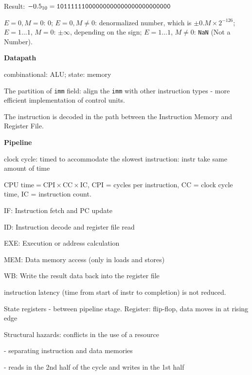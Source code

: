 \documentclass[10pt,landscape,a4paper]{article}
\begin{document}
\begin{multicols}{3}
Result: \(-0.5_{10} = \verb|10111111000000000000000000000000|\)

\(E = 0, M = 0\): 0; \(E = 0, M \neq 0\): denormalized number, which is \(\pm 0.M \times 2^{-126}\); \(E = 1\ldots 1\), \(M = 0\): \(\pm \infty\), depending on the sign; \(E = 1\ldots 1\), \(M \neq 0\): \verb|NaN| (Not a Number).

\textbf{Datapath}

combinational: ALU; state: memory

The partition of \verb|imm| field: align the \verb|imm| with other instruction types - more efficient implementation of control units.

The instruction is decoded in the path between the Instruction Memory and Register File.

\textbf{Pipeline}

clock cycle: timed to accommodate the slowest instruction: instr take same amount of time

\(\text{CPU time} = \text{CPI} \times \text{CC} \times \text{IC}\), CPI = cycles per instruction, CC = clock cycle time, IC = instruction count.

IF: Instruction fetch and PC update

ID: Instruction decode and register file read

EXE: Execution or address calculation

MEM: Data memory access (only in loads and stores)

WB: Write the result data back into the register file

instruction latency (time from start of instr to completion) is not reduced.

State registers - between pipeline stage. Register: flip-flop, data moves in at rising edge 

Structural hazards: conflicts in the use of a resource

- separating instruction and data memories

- reads in the 2nd half of the cycle and writes in the 1st half
\vfill\break
\end{multicols}
\end{document}
